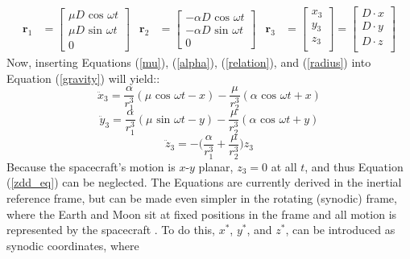 \documentclass[conf]{new-aiaa}
\begin{document}
    \begin{align}
        \bm{r}_1 &= \begin{bmatrix}
		\mu D \text{ cos } \omega t \\ \mu D \text{ sin } \omega t \\ 0
		\end{bmatrix}
		&
        \bm{r}_2 &= \begin{bmatrix}
		-\alpha D \text{ cos } \omega t \\ -\alpha D \text{ sin } \omega t \\ 0
		\end{bmatrix}
		&
		\bm{r}_3 &= \begin{bmatrix}
		x_3 \\
		y_3\\
		z_3\\
		\end{bmatrix}=
		\begin{bmatrix}
		D\cdot x\\
		D\cdot y\\
		D\cdot z\\
		\end{bmatrix}
		\label{radius}
    \end{align}
    Now, inserting Equations (\ref{mu}), (\ref{alpha}), (\ref{relation}), and (\ref{radius}) into Equation (\ref{gravity}) will yield::
    \begin{equation}
        \ddot{x}_3 = \frac{\alpha}{r^3_1}(\mu \text{ cos } \omega t-x) - \frac{\mu}{r^3_2}(\alpha \text{ cos } \omega t+x)
        \label{xdd_eq}
    \end{equation}
    \begin{equation}
        \ddot{y}_3 = \frac{\alpha}{r^3_1}(\mu \text{ sin } \omega t-y) - \frac{\mu}{r^3_2}(\alpha \text{ cos } \omega t+y)
        \label{ydd_eq}
    \end{equation}
    \begin{equation}
        \ddot{z}_3 = -\Bigg(\frac{\alpha}{r^3_1}+ \frac{\mu}{r^3_2}\Bigg)z_3
        \label{zdd_eq}
    \end{equation}
    Because the spacecraft's motion is $x$-$y$ planar, $z_3=0$ at all $t$, and thus Equation (\ref{zdd_eq}) can be neglected. The Equations are currently derived in the inertial reference frame, but can be made even simpler in the rotating (synodic) frame, where the Earth and Moon sit at fixed positions in the frame and all motion is represented by the spacecraft \cite{R3BP}. To do this, $x^*$, $y^*$, and $z^*$, can be introduced as synodic coordinates, where\\
\end{document}
